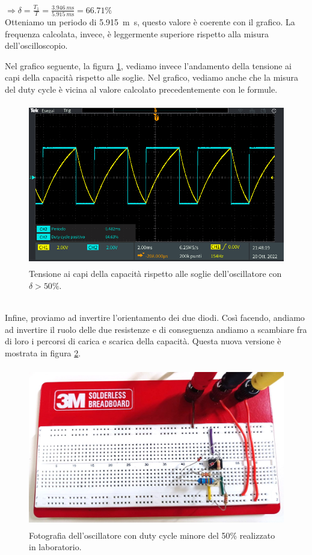 \documentclass{report}
\begin{document}
\\[6pt]\indent$\Rightarrow\displaystyle{\delta=\frac{T_1}{T}=\frac{\SI{3.946}{m\second}}{\SI{5.915}{m\second}}= 66.71\%}$
\\[4pt]Otteniamo un periodo di \SI{5.915}{m\second}, questo valore è coerente con il grafico. La frequenza calcolata, invece, è  leggermente superiore rispetto alla misura dell'oscilloscopio.\par
Nel grafico seguente, la figura \ref{figura:oscillo4_1_soglie}, vediamo invece l'andamento della tensione ai capi della capacità rispetto alle soglie. Nel grafico, vediamo anche che la misura del duty cycle è vicina al valore calcolato precedentemente con le formule.
\begin{figure}[h!]
	\centering
	\includegraphics[height=7.1cm]{immagini/TEK00038}
	\caption{Tensione ai capi della capacità rispetto alle soglie dell'oscillatore con $\delta>50\%$.}
	\label{figura:oscillo4_1_soglie}
\end{figure}
\\Infine, proviamo ad invertire l'orientamento dei due diodi. Così facendo, andiamo ad invertire il ruolo delle due resistenze e di conseguenza andiamo a scambiare fra di loro i percorsi di carica e scarica della capacità. Questa nuova versione è mostrata in figura \ref{figura:circuito4_2}.
\begin{figure}[h!]
	\centering
	\includegraphics[height=7cm]{immagini/circuito4_2.jpg}
	\caption{Fotografia dell'oscillatore con duty cycle minore del 50\% realizzato in laboratorio.}
	\label{figura:circuito4_2}
\end{figure}
\end{document}
